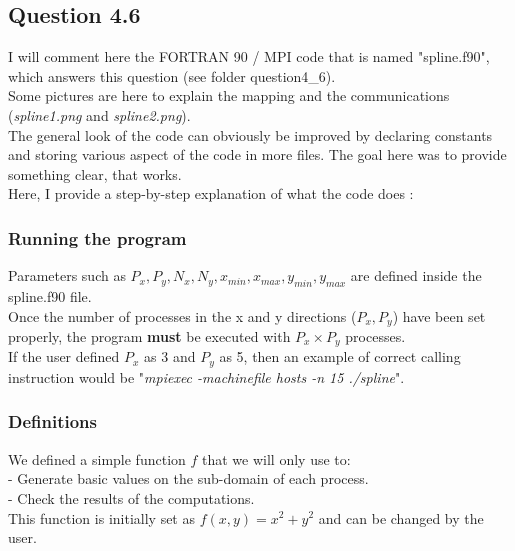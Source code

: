 \documentclass[10pt]{article}
\begin{document}
\subsection{Question 4.6}


I will comment here the FORTRAN 90 / MPI code 
that is named "spline.f90", which answers this question (see folder question4\_6).\\

Some pictures are here to explain the mapping and the communications (\textit{spline1.png} and \textit{spline2.png}).\\

The general look of the code can obviously be improved by declaring constants and storing various aspect of the code in more files. The goal here was to provide something clear, that works.\\

Here, I provide a step-by-step explanation of what the code does :


\subsubsection{Running the program}


Parameters such as $P_x,P_y,N_x,N_y,x_{min},x_{max},y_{min},y_{max}$ are defined inside the spline.f90 file.\\

Once the number of processes in the x and y directions ($P_x,P_y$) have been set properly, the program \textbf{must} be executed with $P_x \times P_y$ processes.\\

If the user defined $P_x$ as 3 and $P_y$ as 5, then an example of correct calling instruction would be "\textit{mpiexec -machinefile hosts -n 15 ./spline}".


\subsubsection{Definitions}


We defined a simple function $f$ that we will only use to:\\
- Generate basic values on the sub-domain of each process.\\
- Check the results of the computations.\\

This function is initially set as $f(x,y)=x^2 +y^2$ and can be changed by the user.\\\\
\end{document}
